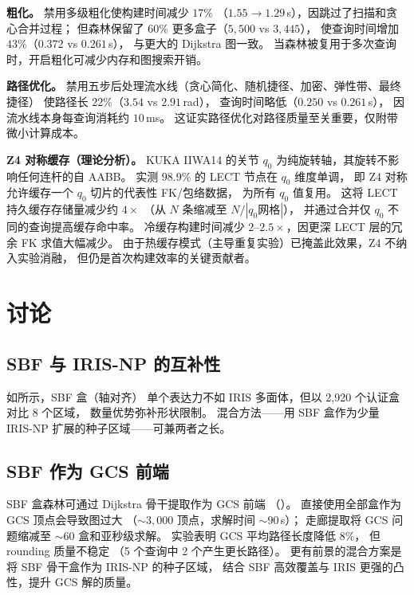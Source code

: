 \documentclass[journal]{IEEEtran}
\begin{document}
\textbf{粗化。}
禁用多级粗化使构建时间减少 $17\%$
（$1.55\to1.29$\,s），因跳过了扫描和贪心合并过程；
但森林保留了 $60\%$ 更多盒子（$5{,}500$ vs $3{,}445$），
使查询时间增加 $43\%$（$0.372$ vs $0.261$\,s），
与更大的 Dijkstra 图一致。
当森林被复用于多次查询时，开启粗化可减少内存和图搜索开销。

\textbf{路径优化。}
禁用五步后处理流水线（贪心简化、随机捷径、加密、弹性带、最终捷径）
使路径长 $22\%$（$3.54$ vs $2.91$\,rad），
查询时间略低（$0.250$ vs $0.261$\,s），
因流水线本身每查询消耗约 $10$\,ms。
这证实路径优化对路径质量至关重要，仅附带微小计算成本。

\textbf{Z4 对称缓存（理论分析）。}
KUKA IIWA14 的关节 $q_0$ 为纯旋转轴，其旋转不影响任何连杆的自 AABB。
实测 $98.9\%$ 的 LECT 节点在 $q_0$ 维度单调，
即 Z4 对称允许缓存一个 $q_0$ 切片的代表性 FK/包络数据，
为所有 $q_0$ 值复用。
这将 LECT 持久缓存存储量减少约 $4{\times}$
（从 $N$ 条缩减至 $N/|q_0\text{网格}|$），
并通过合并仅 $q_0$ 不同的查询提高缓存命中率。
冷缓存构建时间减少 $2$--$2.5{\times}$，因更深 LECT 层的冗余 FK 求值大幅减少。
由于热缓存模式（主导重复实验）已掩盖此效果，Z4 不纳入实验消融，
但仍是首次构建效率的关键贡献者。


\section{讨论}\label{sec:discussion}

\subsection{SBF 与 IRIS-NP 的互补性}

如所示，SBF 盒（轴对齐）
单个表达力不如 IRIS 多面体，但以 2{,}920 个认证盒对比 8 个区域，
数量优势弥补形状限制。
混合方法——用 SBF 盒作为少量 IRIS-NP 扩展的种子区域——可兼两者之长。

\subsection{SBF 作为 GCS 前端}

SBF 盒森林可通过 Dijkstra 骨干提取作为 GCS 前端
（）。
直接使用全部盒作为 GCS 顶点会导致图过大
（${\sim}3{,}000$ 顶点，求解时间 ${\sim}90$\,s）；
走廊提取将 GCS 问题缩减至 ${\sim}60$ 盒和亚秒级求解。
实验表明 GCS 平均路径长度降低 8\%，
但 rounding 质量不稳定
（5 个查询中 2 个产生更长路径）。
更有前景的混合方案是将 SBF 骨干盒作为 IRIS-NP 的种子区域，
结合 SBF 高效覆盖与 IRIS 更强的凸性，提升 GCS 解的质量。
\end{document}
